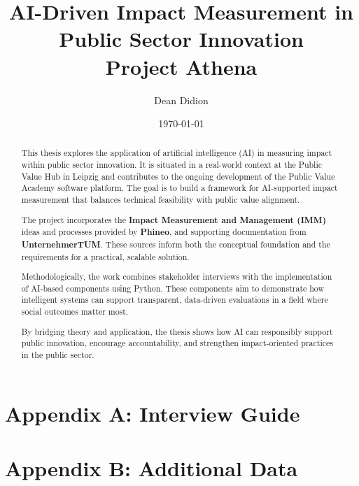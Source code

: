 \documentclass[12pt]{report}
\title{AI-Driven Impact Measurement in Public Sector Innovation\\ \large Project Athena}
\author{Dean Didion}
\date{\today}
\begin{document}
\maketitle

\begin{abstract}
This thesis explores the application of artificial intelligence (AI) in measuring impact within public sector innovation. It is situated in a real-world context at the Public Value Hub in Leipzig and contributes to the ongoing development of the Public Value Academy software platform. The goal is to build a framework for AI-supported impact measurement that balances technical feasibility with public value alignment.


The project incorporates the \textbf{Impact Measurement and Management (IMM)} ideas and processes provided by \textbf{Phineo}, and supporting documentation from \textbf{UnternehmerTUM}. These sources inform both the conceptual foundation and the requirements for a practical, scalable solution.

Methodologically, the work combines stakeholder interviews with the implementation of AI-based components using Python. These components aim to demonstrate how intelligent systems can support transparent, data-driven evaluations in a field where social outcomes matter most.

By bridging theory and application, the thesis shows how AI can responsibly support public innovation, encourage accountability, and strengthen impact-oriented practices in the public sector.
\end{abstract}

\tableofcontents
\newpage















\printbibliography
\appendix
\chapter{Appendix A: Interview Guide}
\lipsum[17]

\chapter{Appendix B: Additional Data}
\lipsum[18]
\end{document}
